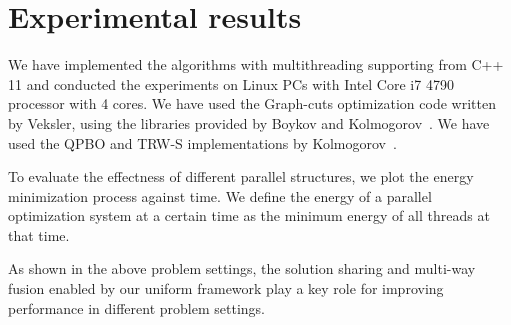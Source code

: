 \section{Experimental results}
\label{section:results}
We have implemented the algorithms with multithreading supporting from
C++ 11 and conducted the experiments on Linux PCs with Intel Core i7
4790 processor with 4 cores. We have used the Graph-cuts optimization
code written by Veksler, using the libraries provided by Boykov and
Kolmogorov~\cite{middlebury_mrf,alpha_expansion,what_energy_can_be_min_by_gc,mrf_experimental}.
%
%
We have used the QPBO and TRW-S implementations by
Kolmogorov~\cite{QPBO, TRW-S_implementation}.

To evaluate the effectness of different parallel structures, we plot
the energy minimization process against time. We define the energy of
a parallel optimization system at a certain time as the minimum energy
of all threads at that time.





As shown in the above problem settings, the solution sharing and multi-way fusion enabled by our uniform framework play a key role for improving performance in different problem settings.